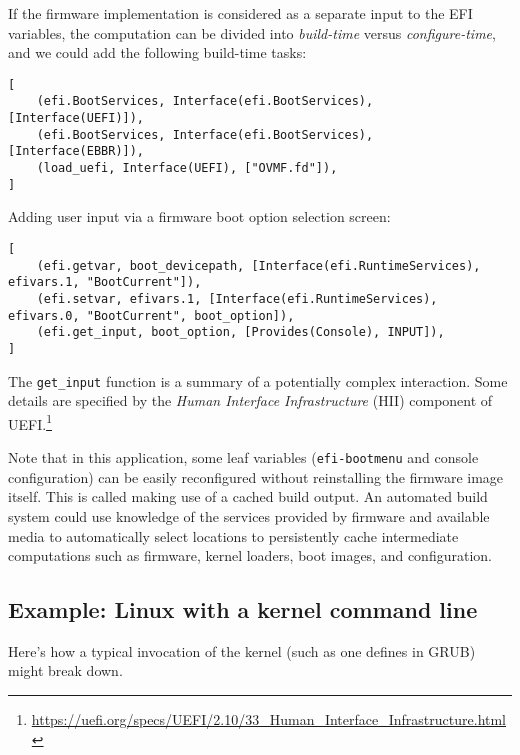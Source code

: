 %
If the firmware implementation is considered as a separate input to the EFI variables, the computation can be divided into \emph{build-time} versus \emph{configure-time}, and we could add the following build-time tasks:
\begin{verbatim}
[
    (efi.BootServices, Interface(efi.BootServices), [Interface(UEFI)]),
    (efi.BootServices, Interface(efi.BootServices), [Interface(EBBR)]),
    (load_uefi, Interface(UEFI), ["OVMF.fd"]),
]
\end{verbatim}

Adding user input via a firmware boot option selection screen:
\begin{verbatim}
[
    (efi.getvar, boot_devicepath, [Interface(efi.RuntimeServices), efivars.1, "BootCurrent"]),
    (efi.setvar, efivars.1, [Interface(efi.RuntimeServices), efivars.0, "BootCurrent", boot_option]),
    (efi.get_input, boot_option, [Provides(Console), INPUT]),
]
\end{verbatim}
The \texttt{get\_input} function is a summary of a potentially complex interaction.
%
Some details are specified by the \emph{Human Interface Infrastructure} (HII) component of UEFI.\footnote{\url{https://uefi.org/specs/UEFI/2.10/33_Human_Interface_Infrastructure.html}}


Note that in this application, some leaf variables (\texttt{efi-bootmenu} and console configuration) can be easily
reconfigured without reinstalling the firmware image itself. 
%
This is called making use of a cached build output.
%
An automated build system could use knowledge of the services provided by firmware and available media to automatically select locations to persistently cache intermediate computations such as firmware, kernel loaders, boot images, and configuration.

\hypertarget{example-linux-with-a-kernel-command-line}{%
\subsection{Example: Linux with a kernel command
line}\label{example-linux-with-a-kernel-command-line}}

Here's how a typical invocation of the kernel (such as one defines in
GRUB) might break down.

